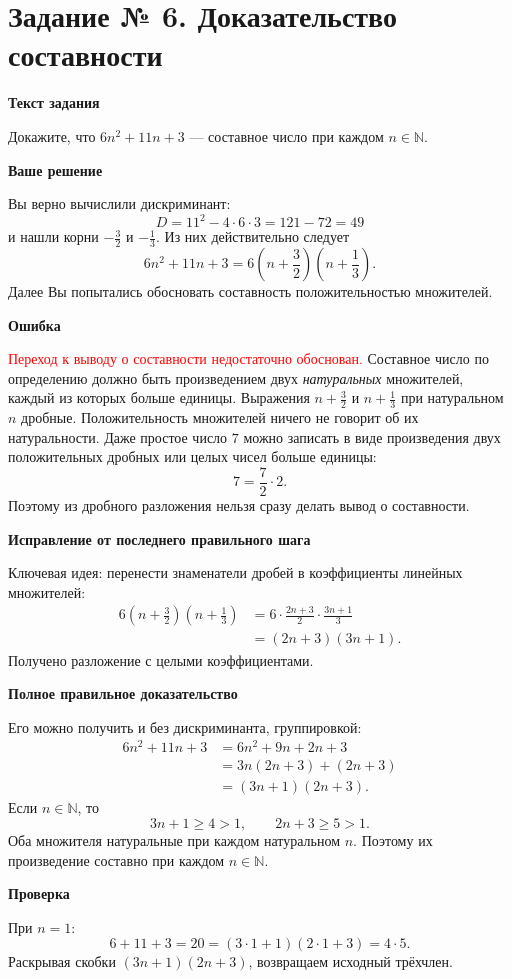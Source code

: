 \documentclass[12pt,a4paper]{article}
\newcommand{\parthead}[1]{\par\medskip\textbf{#1}\par\smallskip}
\begin{document}
\clearpage
{}\label{task:6}
\section*{Задание № 6. Доказательство составности}
\parthead{Текст задания}
Докажите, что $6n^2+11n+3$ --- составное число при каждом $n\in\mathbb N$.

\parthead{Ваше решение}
Вы верно вычислили дискриминант:
\[
D=11^2-4\cdot6\cdot3=121-72=49
\]
и нашли корни $-\frac32$ и $-\frac13$. Из них действительно следует
\[
6n^2+11n+3=
6\left(n+\frac32\right)\left(n+\frac13\right).
\]
Далее Вы попытались обосновать составность положительностью множителей.

\parthead{Ошибка}
\textcolor{red}{Переход к выводу о составности недостаточно обоснован.}
Составное число по определению должно быть произведением двух \emph{натуральных} множителей, каждый из которых больше единицы. Выражения $n+\frac32$ и $n+\frac13$ при натуральном $n$ дробные. Положительность множителей ничего не говорит об их натуральности. Даже простое число $7$ можно записать в виде произведения двух положительных дробных или целых чисел больше единицы:
\[
7=\frac72\cdot2.
\]
Поэтому из дробного разложения нельзя сразу делать вывод о составности.

\parthead{Исправление от последнего правильного шага}
\textcolor{blue!60!black}{Ключевая идея:} перенести знаменатели дробей в коэффициенты линейных множителей:
\[
\begin{aligned}
6\left(n+\frac32\right)\left(n+\frac13\right)
&=6\cdot\frac{2n+3}{2}\cdot\frac{3n+1}{3}\\
&=(2n+3)(3n+1).
\end{aligned}
\]
Получено разложение с целыми коэффициентами.

\parthead{Полное правильное доказательство}
Его можно получить и без дискриминанта, группировкой:
\[
\begin{aligned}
6n^2+11n+3
&=6n^2+9n+2n+3\\
&=3n(2n+3)+(2n+3)\\
&=(3n+1)(2n+3).
\end{aligned}
\]
Если $n\in\mathbb N$, то
\[
3n+1\ge4>1,\qquad 2n+3\ge5>1.
\]
Оба множителя натуральные при каждом натуральном $n$. Поэтому их произведение составно при каждом $n\in\mathbb N$.

\parthead{Проверка}
При $n=1$:
\[
6+11+3=20=(3\cdot1+1)(2\cdot1+3)=4\cdot5.
\]
Раскрывая скобки $(3n+1)(2n+3)$, возвращаем исходный трёхчлен.
\end{document}
